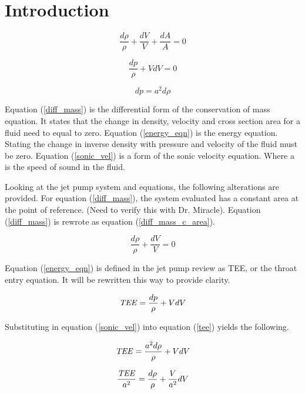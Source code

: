 \documentclass{article}
\newcommand\Tee{\mbox{\textit{TEE}}}  %
\begin{document}
\section{Introduction}

\begin{equation}
\frac{d\rho}{\rho} + \frac{dV}{V} + \frac{dA}{A} = 0
\label{diff_mass}
\end{equation}

\begin{equation}
\frac{dp}{\rho} + VdV = 0
\label{energy_eqn}
\end{equation}

\begin{equation}
dp = a^2d\rho
\label{sonic_vel}
\end{equation}

Equation (\ref{diff_mass}) is the differential form of the conservation of mass equation. It states that the change in density, velocity and cross section area for a fluid need to equal to zero. Equation (\ref{energy_eqn}) is the energy equation. Stating the change in inverse density with pressure and velocity of the fluid must be zero. Equation (\ref{sonic_vel}) is a form of the sonic velocity equation. Where a is the speed of sound in the fluid. 

Looking at the jet pump system and equations, the following alterations are provided. For equation (\ref{diff_mass}), the system evaluated has a constant area at the point of reference. (Need to verify this with Dr. Miracle). Equation (\ref{diff_mass}) is rewrote as equation (\ref{diff_mass_c_area}).

\begin{equation}
\frac{d\rho}{\rho} + \frac{dV}{V} = 0
\label{diff_mass_c_area}
\end{equation}

Equation (\ref{energy_eqn}) is defined in the jet pump review as TEE, or the throat entry equation. It will be rewritten this way to provide clarity.

\begin{equation}
    \Tee = \frac{dp}{\rho} + VdV
\label{tee}
\end{equation}

Substituting in equation (\ref{sonic_vel}) into equation (\ref{tee}) yields the following.

\begin{equation}
    \Tee = \frac{a^2d\rho}{\rho} + VdV
\end{equation}

\begin{equation}
    \frac{\Tee}{a^2} = \frac{d\rho}{\rho} + \frac{V}{a^2}dV
    \label{tee_sub}
\end{equation}
\end{document}
